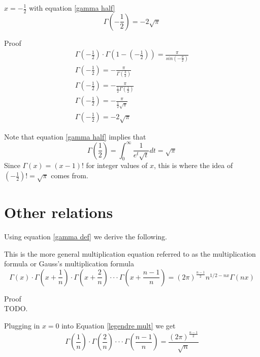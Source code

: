 \documentclass[a4paper]{article}
\begin{document}
\begin{theorem}
$x = -\frac{1}{2}$ with equation \ref{gamma half}
\begin{equation} \label{negative gamma half}
\Gamma(-\frac{1}{2}) = -2 \sqrt{\pi}
\end{equation}

Proof
\\
\begin{gather*}
\Gamma(-\frac{1}{2}) \cdot \Gamma(1-(-\frac{1}{2})) = \frac{\pi}{sin(-\frac{\pi}{2})}
\\
\Gamma(-\frac{1}{2}) = -\frac{\pi}{\Gamma(\frac{3}{2})}
\\
\Gamma(-\frac{1}{2}) = -\frac{\pi}{\frac{1}{2} \Gamma(\frac{1}{2})}
\\
\Gamma(-\frac{1}{2}) = -\frac{\pi}{\frac{1}{2} \sqrt{\pi}}
\\
\Gamma(-\frac{1}{2}) = -2\sqrt{\pi}
\end{gather*}

\end{theorem}



Note that equation \ref{gamma half} implies that 
\begin{equation}
\Gamma(\frac{1}{2}) = \int_{0}^{\infty} \frac{1}{e^t \sqrt{t}} dt = \sqrt{\pi}
\end{equation}
Since $\Gamma(x) = (x-1)!$ for integer values of $x$, this is where the idea of $(-\frac{1}{2})! = \sqrt{\pi}$ comes from.

\section{Other relations}
Using equation \ref{gamma def} we derive the following. 

\begin{theorem} 
This is the more general multiplication equation referred to as the multiplication formula or Gauss's multiplication formula
\begin{equation} \label{legendre mult}
\boxed{
\Gamma(x) \cdot \Gamma(x+\frac{1}{n}) \cdot \Gamma(x+\frac{2}{n}) \cdot \cdot \cdot \Gamma(x+\frac{n-1}{n}) = (2 \pi)^{\frac{n-1}{2}} n^{1/2 - nx} \Gamma(nx)
}
\end{equation}

Proof
\\
TODO.
\end{theorem}

Plugging in $x=0$ into Equation \ref{legendre mult} we get
\begin{equation}
\Gamma(\frac{1}{n}) \cdot \Gamma(\frac{2}{n}) \cdot \cdot \cdot \Gamma(\frac{n-1}{n}) = \frac{(2 \pi)^{\frac{n-1}{2}}}{\sqrt{n}}  
\end{equation}
\end{document}
